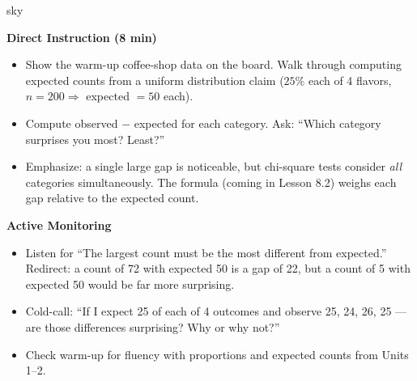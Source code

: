 \documentclass[10pt]{article}
\begin{document}
\begin{skillbox}{sky}
\begin{minipage}[t]{0.48\linewidth}
    \textbf{Direct Instruction (8 min)}
    \begin{itemize}
        \item Show the warm-up coffee-shop data on the board. Walk through
              computing expected counts from a uniform distribution claim
              ($25\%$ each of 4 flavors, $n = 200 \Rightarrow$ expected $= 50$ each).
        \item Compute observed $-$ expected for each category. Ask: ``Which
              category surprises you most? Least?''
        \item Emphasize: a single large gap is noticeable, but chi-square tests
              consider \emph{all} categories simultaneously. The formula
              (coming in Lesson 8.2) weighs each gap relative to the expected count.
    \end{itemize}
\end{minipage}
\hfill
\begin{minipage}[t]{0.48\linewidth}
    \textbf{Active Monitoring}
    \begin{itemize}
        \item Listen for ``The largest count must be the most different from
              expected.'' Redirect: a count of 72 with expected 50 is a gap of 22,
              but a count of 5 with expected 50 would be far more surprising.
        \item Cold-call: ``If I expect 25 of each of 4 outcomes and observe
              25, 24, 26, 25 --- are those differences surprising? Why or why not?''
        \item Check warm-up for fluency with proportions and expected counts
              from Units 1--2.
    \end{itemize}
\end{minipage}
\end{skillbox}
\end{document}

